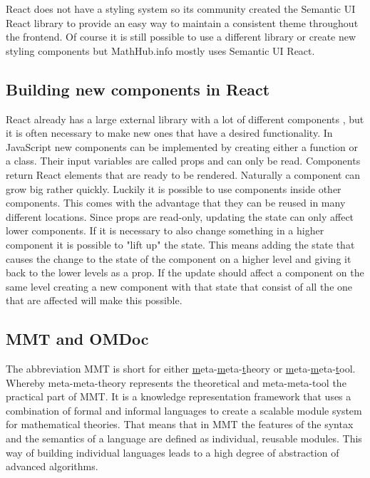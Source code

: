 \documentclass[11pt,a4paper]{article}
\begin{document}
React does not have a styling system so its community created the Semantic UI React library to provide an easy way to maintain a consistent theme throughout the frontend.
Of course it is still possible to use a different library or create new styling components but MathHub.info mostly uses Semantic UI React.

\subsection{Building new components in React}
React already has a large external library with a lot of different components , but it is often necessary to make new ones that have a desired functionality.
In JavaScript new components can be implemented by creating either a function or a class.
Their input variables are called props and can only be read.
Components return React elements that are ready to be rendered. 
Naturally a component can grow big rather quickly.
Luckily it is possible to use components inside other components.
This comes with the advantage that they can be reused in many different locations.
Since props are read-only, updating the state can only affect lower components.
If it is necessary to also change something in a higher component it is possible to "lift up" the state.
This means adding the state that causes the change to the state of the component on a higher level and giving it back to the lower levels as a prop.
If the update should affect a component on the same level creating a new component with that state that consist of all the one that are affected will  make this possible.
\cite{reactjsGS}

\subsection{MMT and OMDoc}
The abbreviation MMT is short for either \underline{m}eta-\underline{m}eta-\underline{t}heory or \underline{m}eta-\underline{m}eta-\underline{t}ool.
Whereby meta-meta-theory represents the theoretical and meta-meta-tool the practical part of MMT.
It is a knowledge representation framework that uses a combination of formal and informal languages to create a scalable module system for mathematical theories.
That means that in MMT the features of the syntax and the semantics of a language are defined as individual, reusable modules.
This way of building individual languages leads to a high degree of abstraction of advanced algorithms.
\end{document}
